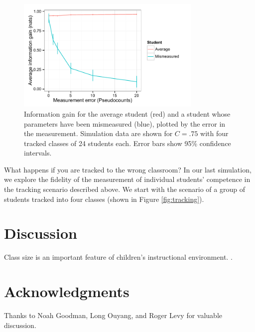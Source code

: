 \documentclass[10pt,letterpaper]{article}
\begin{document}
\begin{figure}[t]
\begin{center}
\includegraphics[width=3.5in]{figures/mismeasured.pdf}
\end{center}
\caption{\label{fig:mismeasure} Information gain for the average student (red) and a student whose parameters have been mismeasured (blue), plotted by the error in the measurement. Simulation data are shown for $C=.75$ with four tracked classes of 24 students each. Error bars show 95\% confidence intervals.}
\end{figure}

What happens if you are tracked to the wrong classroom? In our last simulation, we explore the fidelity of the measurement of individual students' competence in the tracking scenario described above. We start with the scenario of a group of students tracked into four classes (shown in Figure \ref{fig:tracking}). 


\section{Discussion}

Class size is an important feature of children's instructional environment. \cite{glass1979}.


\section{Acknowledgments}

Thanks to Noah Goodman, Long Ouyang, and Roger Levy for valuable discussion.



\setlength{\bibleftmargin}{.125in}
\setlength{\bibindent}{-\bibleftmargin}


\end{document}
